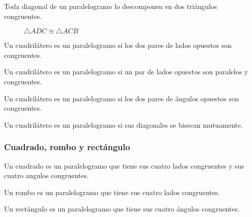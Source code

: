 \clearpage

\begin{theorem}
    Toda diagonal de un paralelogramo lo descomponen en dos triángulos congruentes.
    
    \begin{figure}[!h]
        \centering
        
        \caption{$\triangle{ADC} \cong \triangle{ACB}$}
        \label{fig:theorem13}
    \end{figure}
    
\end{theorem}

\begin{theorem}
    Un cuadrilátero es un paralelogramo si los dos pares de lados opuestos son congruentes.
\end{theorem}

\begin{theorem}
    Un cuadrilátero es un paralelogramo si un par de lados opuestos son paralelos y congruentes.
\end{theorem}

\begin{theorem}
    Un cuadrilátero es un paralelogramo si los dos pares de ángulos opuestos son congruentes.
\end{theorem}

\begin{theorem}
    Un cuadrilátero es un paralelogramo si sus diagonales se bisecan mutuamente.
\end{theorem}

\subsubsection{Cuadrado, rombo y rectángulo}

\begin{definition}
    Un cuadrado es un paralelogramo que tiene sus cuatro lados congruentes y sus cuatro angulos congruentes.
\end{definition}

\begin{definition}
    Un rombo es un paralelogramo que tiene sus cuatro lados congruentes.
\end{definition}

\begin{definition}
    Un rectángulo es un paralelogramo que tiene sus cuatro ángulos congruentes.
\end{definition}

